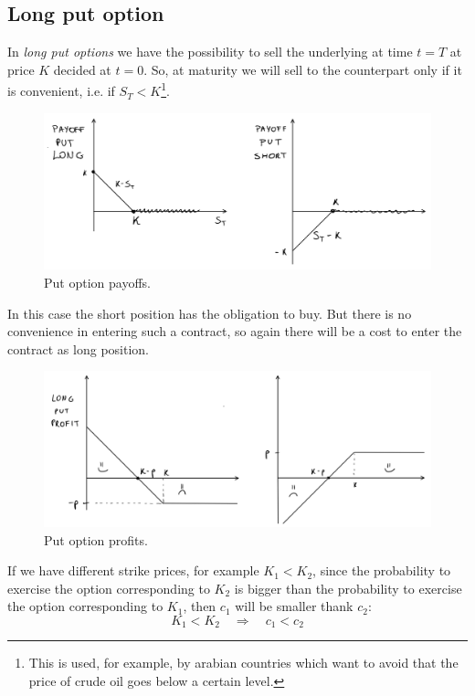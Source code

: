 \subsection{Long put option}
In \emph{long put options} we have the possibility to sell the underlying at time $t=T$ at price $K$ decided at $t=0$. So, at maturity we will sell to the counterpart only if it is convenient, i.e. if $S_T<K$\footnote{This is used, for example, by arabian countries which want to avoid that the price of crude oil goes below a certain level.}.
\begin{figure}[h]
    \centering
    \includegraphics[scale=0.2]{fig/tmp/fig4}
    \caption{Put option payoffs.}
    \label{fig:figura4}
\end{figure}
In this case the short position has the obligation to buy. But there is no convenience in entering such a contract, so again there will be a cost to enter the contract as long position.
\begin{figure}[h]
    \centering
    \includegraphics[scale=0.2]{fig/tmp/fig5}
    \caption{Put option profits.}
    \label{fig:figura5}
\end{figure}
If we have different strike prices, for example $K_1<K_2$, since the probability to exercise the option corresponding to $K_2$ is bigger than the probability to exercise the option corresponding to $K_1$, then $c_1$ will be smaller thank $c_2$:
\begin{equation*}
    K_1 < K_2 \quad\Rightarrow\quad c_1 < c_2
\end{equation*}
